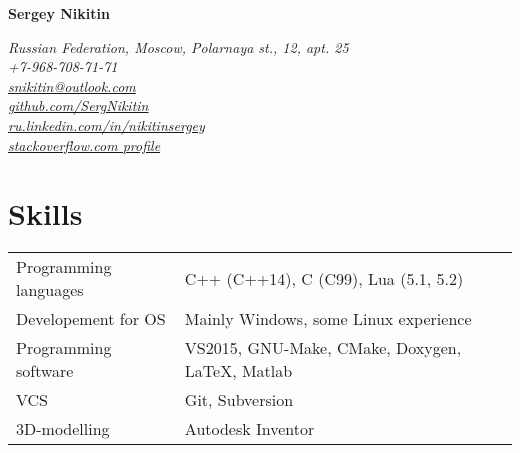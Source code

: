 \documentclass[a4paper, 11pt]{article}
\begin{document}
{\LARGE\textbf{Sergey Nikitin}}

\begin{flushright}
    {\itshape
        Russian Federation, Moscow, Polarnaya st., 12, apt. 25                                  \\
        +7-968-708-71-71                                                                        \\
        \href{mailto:snikitin@outlook.com}{snikitin@outlook.com}                                \\
        \href{https://github.com/SergNikitin}{github.com/SergNikitin}                           \\
        \href{http://ru.linkedin.com/in/nikitinsergey}{ru.linkedin.com/in/nikitinsergey}        \\
        \href{http://stackoverflow.com/users/3375765/sergey-nikitin}{stackoverflow.com profile} \\
    }
\end{flushright}

\section{Skills}
\begin{tabular}{ll}
    Programming languages    & C++ (C++14), C (C99), Lua (5.1, 5.2)            \\
    Developement for OS      & Mainly Windows, some Linux experience           \\
    Programming software     & VS2015, GNU-Make, CMake, Doxygen, LaTeX, Matlab \\
    VCS                      & Git, Subversion                                 \\
    3D-modelling             & Autodesk Inventor
\end{tabular}
\end{document}
